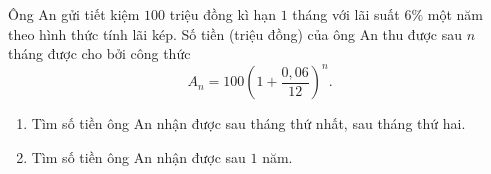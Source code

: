 
\begin{vd}%
	Ông An gửi tiết kiệm $100$ triệu đồng kì hạn $1$ tháng với lãi suất $6\%$ một năm theo hình thức tính lãi kép. Số tiền (triệu đồng) của ông An thu được sau $n$ tháng được cho bởi công thức 
	$$A_n=100\left(1+\dfrac{0{,}06}{12}\right)^n.$$
	\begin{enumerate}
		\item Tìm số tiền ông An nhận được sau tháng thứ nhất, sau tháng thứ hai.
		\item Tìm số tiền ông An nhận được sau $1$ năm.
	\end{enumerate}
\end{vd}

